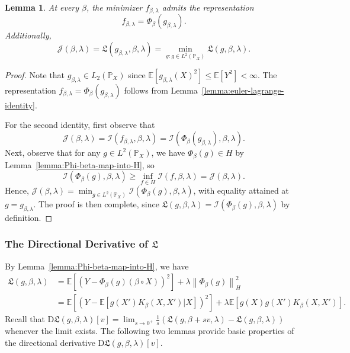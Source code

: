 \documentclass[sn-mathphys-num]{sn-jnl}%
\numberwithin{equation}{section}
\newcommand{\E}{\mathbb{E}}
\newcommand{\kernel}{K}
\newcommand{\norm}[1]{\left\|{#1}\right\|} %
\renewcommand{\P}{\mathbb{P}}
\newtheorem{lemma}{Lemma}
\theoremstyle{thmstyleone}%
\theoremstyle{thmstyletwo}%
\theoremstyle{thmstylethree}%
\begin{document}
\vspace{1em} 
\begin{lemma}
\label{lemma:population-level-representer-theorem}
At every $\beta$, the minimizer $f_{\beta, \lambda}$ admits the representation 
\begin{equation*}
	f_{\beta, \lambda} = \Phi_\beta(g_{\beta, \lambda}).
\end{equation*}
Additionally, 
\begin{equation*} 
	\mathcal{J}(\beta, \lambda) = \mathfrak{L}(g_{\beta, \lambda}, \beta, \lambda)
		= \min_{g: g \in L^2(\P_X)} \mathfrak{L}(g, \beta, \lambda).
\end{equation*}
\end{lemma} 
\begin{proof} 
Note that 
$g_{\beta, \lambda} \in L_2(\P_X)$ since $\E[g_{\beta, \lambda}(X)^2] \le \E[Y^2] < \infty$.
The representation $f_{\beta, \lambda} = \Phi_\beta(g_{\beta, \lambda})$ follows from Lemma~\ref{lemma:euler-lagrange-identity}. 

For the second identity, first observe that
\begin{equation*}
    \mathcal{J}(\beta, \lambda) = \mathcal{I}(f_{\beta, \lambda}, \beta, \lambda) = \mathcal{I}(\Phi_\beta(g_{\beta, \lambda}), \beta, \lambda).
\end{equation*}
Next, observe that for any $g \in L^2(\P_X)$, we have $\Phi_\beta(g) \in H$ by Lemma~\ref{lemma:Phi-beta-map-into-H}, so
\begin{equation*}
    \mathcal{I}(\Phi_\beta(g), \beta, \lambda) \ge \inf_{f \in H} \mathcal{I}(f, \beta, \lambda) = \mathcal{J}(\beta, \lambda).
\end{equation*}
Hence, $\mathcal{J}(\beta, \lambda) = \min_{g \in L^2(\P_X)} \mathcal{I}(\Phi_\beta(g), \beta, \lambda)$, with equality attained at \( g = g_{\beta, \lambda} \). The proof is then complete, since $\mathfrak{L}(g, \beta, \lambda) = \mathcal{I}(\Phi_\beta(g), \beta, \lambda)$ by definition. 
\end{proof} 

\subsubsection{The Directional Derivative of $\mathfrak{L}$}
\label{sec:the-functional-mathfrak-L-and-its-differentiability}
By Lemma~\ref{lemma:Phi-beta-map-into-H}, we have 
\begin{equation*}
\begin{split} 
	\mathfrak{L}(g, \beta, \lambda) &= 
		\E[(Y- \Phi_\beta(g)(\beta \circ X))^2] + \lambda \norm{\Phi_\beta(g)}_H^2 \\
		&= 
	\E[(Y- \E[g(X') \kernel_\beta(X, X')|X])^2] + \lambda \E[g(X) g(X') \kernel_\beta(X, X')].
\end{split} 
\end{equation*}
Recall that 
$\mathrm{D} \mathfrak{L}(g, \beta, \lambda)[v] = \lim_{s \to 0^+} \frac{1}{s}
	(\mathfrak{L}(g, \beta + s v, \lambda) - \mathfrak{L}(g, \beta, \lambda))$ whenever the limit exists. 
The following two lemmas provide basic properties of the directional derivative $\mathrm{D} \mathfrak{L}(g, \beta, \lambda)[v]$.	
	
\end{document}
